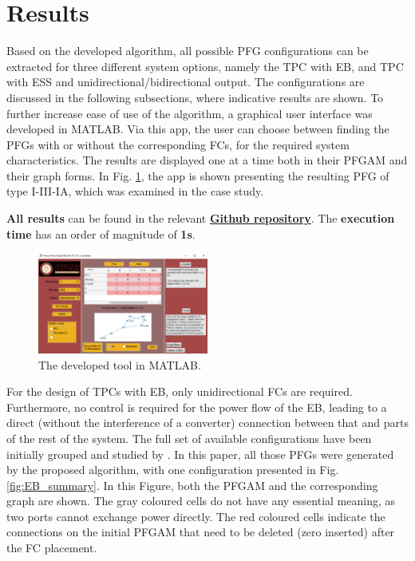 \documentclass[conference]{IEEEtran}
\begin{document}
\section{Results}
Based on the developed algorithm, all possible PFG configurations can be extracted for three different system options, namely the TPC with EB, and TPC with ESS and unidirectional/bidirectional output. The configurations are discussed in the following subsections, where indicative results are shown. To further increase ease of use of the algorithm, a graphical user interface was developed in MATLAB. Via this app, the user can choose between finding the PFGs with or without the corresponding FCs, for the required system characteristics. The results are displayed one at a time both in their PFGAM and their graph forms. In Fig. \ref{fig:app}, the app is shown presenting the resulting PFG of type I-III-IA, which was examined in the case study.

\textbf{All results} can be found in the relevant \textbf{\href{https://github.com/gsalagiannis/Algorithmic-approach-on-the-exctraction-of-power-flow-configurations-for-R2P2-DC-DC-converters}{Github repository}}. The \textbf{execution time} has an order of magnitude of \textbf{1s}.

\begin{figure}[htbp]
    \centering
    \includegraphics[width=0.5\textwidth]{App.png} %
    \caption{The developed tool in MATLAB.}
    \label{fig:app}
\end{figure}

For the design of TPCs with EB, only unidirectional FCs are required. Furthermore, no control is required for the power flow of the EB, leading to a direct (without the interference of a converter) connection between that and parts of the rest of the system. The full set of available configurations have been initially grouped and studied by \cite{zogogianni_non-isolated_2019}. In this paper, all those PFGs were generated by the proposed algorithm, with one configuration presented in Fig. \ref{fig:EB_summary}. In this Figure, both the PFGAM and the corresponding graph are shown. The gray coloured cells do not have any essential meaning, as two ports cannot exchange power directly. The red coloured cells indicate the connections on the initial PFGAM that need to be deleted (zero inserted) after the FC placement.
\end{document}
